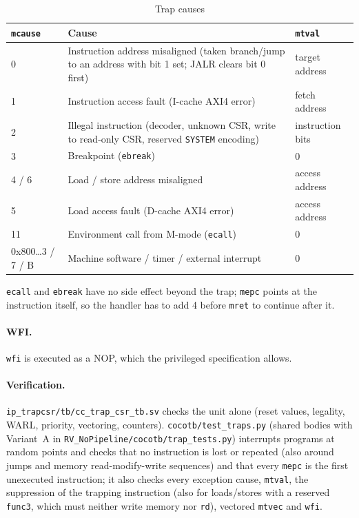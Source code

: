 \begin{table}[htbp]
\caption{Trap causes}
\label{tab:asTrapCause}
\centering
{\footnotesize
\begin{tabularx}{\textwidth}{|l |X |X |}
  \hline
  \texttt{mcause} & Cause & \texttt{mtval} \\
  \hline
  \hline
  0 & Instruction address misaligned (taken branch/jump to an address with
      bit 1 set; JALR clears bit 0 first) & target address \\
  \hline
  1 & Instruction access fault (I-cache AXI4 error) & fetch address \\
  \hline
  2 & Illegal instruction (decoder, unknown CSR, write to read-only CSR,
      reserved \texttt{SYSTEM} encoding) & instruction bits \\
  \hline
  3 & Breakpoint (\texttt{ebreak}) & 0 \\
  \hline
  4 / 6 & Load / store address misaligned & access address \\
  \hline
  5 & Load access fault (D-cache AXI4 error) & access address \\
  \hline
  11 & Environment call from M-mode (\texttt{ecall}) & 0 \\
  \hline
  \hline
  0x800\ldots3 / 7 / B & Machine software / timer / external interrupt & 0 \\
  \hline
\end{tabularx}}
\end{table}

\texttt{ecall} and \texttt{ebreak} have no side effect beyond the trap;
\texttt{mepc} points at the instruction itself, so the handler has to add 4
before \texttt{mret} to continue after it.

\paragraph{WFI.}
\texttt{wfi} is executed as a NOP, which
the privileged specification allows.

\paragraph{Verification.}
\texttt{ip\_trapcsr/tb/cc\_trap\_csr\_tb.sv} checks the unit alone (reset
values, legality, WARL, priority, vectoring, counters).
\texttt{cocotb/test\_traps.py} (shared bodies with Variant~A in
\texttt{RV\_NoPipeline/cocotb/trap\_tests.py}) interrupts programs at random
points and checks that no instruction is lost or repeated (also around
jumps and memory read-modify-write sequences) and that every \texttt{mepc}
is the first unexecuted instruction; it also checks every exception cause,
\texttt{mtval}, the suppression of the trapping instruction (also for
loads/stores with a reserved \texttt{func3}, which must neither write
memory nor \texttt{rd}), vectored \texttt{mtvec} and \texttt{wfi}.


